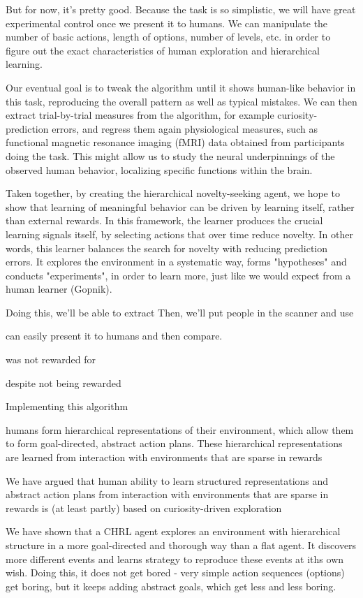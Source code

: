 \documentclass{article}
\begin{document}
But for now, it's pretty good. Because the task is so simplistic, we will have great experimental control once we present it to humans. We can manipulate the number of basic actions, length of options, number of levels, etc. in order to figure out the exact characteristics of human exploration and hierarchical learning. 

Our eventual goal is to tweak the algorithm until it shows human-like behavior in this task, reproducing the overall pattern as well as typical mistakes. We can then extract trial-by-trial measures from the algorithm, for example curiosity-prediction errors, and regress them again physiological measures, such as functional magnetic resonance imaging (fMRI) data obtained from participants doing the task. This might allow us to study the neural underpinnings of the observed human behavior, localizing specific functions within the brain.

Taken together, by creating the hierarchical novelty-seeking agent, we hope to show that learning of meaningful behavior can be driven by learning itself, rather than external rewards. In this framework, the learner produces the crucial learning signals itself, by selecting actions that over time reduce novelty. In other words, this learner balances the search for novelty with reducing prediction errors. It explores the environment in a systematic way, forms "hypotheses" and conducts "experiments", in order to learn more, just like we would expect from a human learner (Gopnik).

Doing this, we'll be able to extract  Then, we'll put people in the scanner and use 


can easily present it to humans and then compare. 

was not rewarded for 

despite not being rewarded  


Implementing this algorithm


humans form hierarchical representations of their environment, which allow them to form goal-directed, abstract action plans. These hierarchical representations are learned from interaction with environments that are sparse in rewards

We have argued that human ability to learn structured representations and abstract action plans from interaction with environments that are sparse in rewards is (at least partly) based on curiosity-driven exploration 

We have shown that a CHRL agent explores an environment with hierarchical structure in a more goal-directed and thorough way than a flat agent. It discovers more different events and learns strategy to reproduce these events at iths own wish. Doing this, it does not get bored - very simple action sequences (options) get boring, but it keeps adding abstract goals, which get less and less boring. 
\end{document}
